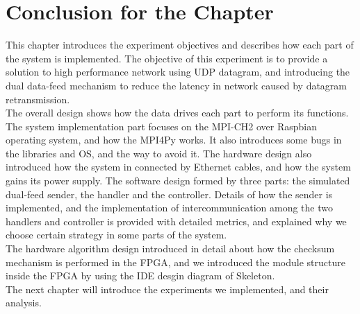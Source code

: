 \documentclass[11pt,openright,a4paper]{report}
\begin{document}
\section{Conclusion for the Chapter}
This chapter introduces the experiment objectives and describes how each part of the system is implemented. The objective of this experiment is to provide a solution to high performance network using UDP datagram, and introducing the dual data-feed mechanism to reduce the latency in network caused by datagram retransmission.\\
The overall design shows how the data drives each part to perform its functions. The system implementation part focuses on the MPI-CH2 over Raspbian operating system, and how the MPI4Py works. It also introduces some bugs in the libraries and OS, and the way to avoid it. The hardware design also introduced how the system in connected by Ethernet cables, and how the system gains its power supply. The software design formed by three parts: the simulated dual-feed sender, the handler and the controller. Details of how the sender is implemented, and the implementation of intercommunication among the two handlers and controller is provided with detailed metrics, and explained why we choose certain strategy in some parts of the system.\\
The hardware algorithm design introduced in detail about how the checksum mechanism is performed in the FPGA, and we introduced the module structure inside the FPGA by using the IDE desgin diagram of Skeleton.\\
The next chapter will introduce the experiments we implemented, and their analysis.
\end{document}
